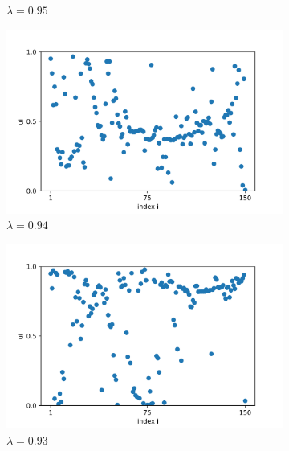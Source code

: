 \documentclass[a4paper,12pt]{article}
\begin{document}
\begin{figure}[H]
\begin{subfigure}{.32\textwidth}
  \caption{$\lambda=0.95$}
\end{subfigure}

\begin{subfigure}{.32\textwidth}
  \centering
  \includegraphics[width=1\linewidth]{u_lambda=0.94_t=2000.png}  
  \caption{$\lambda=0.94$}
\end{subfigure}
\hfill
\begin{subfigure}{.32\textwidth}
  \centering
  \includegraphics[width=1\linewidth]{u_lambda=0.93_t=2000.png}  
  \caption{$\lambda=0.93$}
\end{subfigure}
\hfill
\begin{subfigure}{.32\textwidth}
  \centering

\end{subfigure}
\end{figure}
\end{document}
